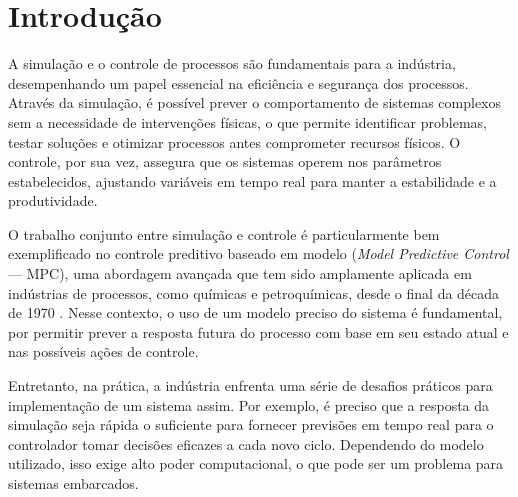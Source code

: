 \section{Introdução}

%
%
A simulação e o controle de processos são fundamentais para a indústria, desempenhando um papel essencial na eficiência e segurança dos processos. Através da simulação, é possível prever o comportamento de sistemas complexos sem a necessidade de intervenções físicas, o que permite identificar problemas, testar soluções e otimizar processos antes comprometer recursos físicos. O controle, por sua vez, assegura que os sistemas operem nos parâmetros estabelecidos, ajustando variáveis em tempo real para manter a estabilidade e a produtividade.

O trabalho conjunto entre simulação e controle é particularmente bem exemplificado no controle preditivo baseado em modelo (\textit{Model Predictive Control} — MPC), uma abordagem avançada que tem sido amplamente aplicada em indústrias de processos, como químicas e petroquímicas, desde o final da década de 1970 \citep{garcia_1989}. Nesse contexto, o uso de um modelo preciso do sistema é fundamental, por permitir prever a resposta futura do processo com base em seu estado atual e nas possíveis ações de controle.

Entretanto, na prática, a indústria enfrenta uma série de desafios práticos para implementação de um sistema assim. Por exemplo, é preciso que a resposta da simulação seja rápida o suficiente para fornecer previsões em tempo real para o controlador tomar decisões eficazes a cada novo ciclo. Dependendo do modelo utilizado, isso exige alto poder computacional, o que pode ser um problema para sistemas embarcados.%



